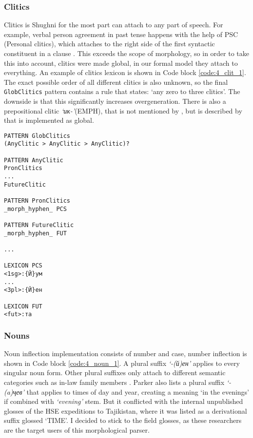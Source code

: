 \subsubsection*{Clitics}
Clitics is Shughni for the most part can attach to any part of speech. For example, verbal person agreement in past tense happens with the help of PSC (Personal clitics), which attaches to the right side of the first syntactic constituent in a clause \parencite[262]{parker_shughni_2023}. This exceeds the scope of morphology, so in order to take this into account, clitics were made global, in our formal model they attach to everything. An example of clitics lexicon is shown in Code block \ref{code:4_clit_1}. The exact possible order of all different clitics is also unknown, so the final \texttt{GlobClitics} pattern contains a rule that states: `any zero to three clitics'. The downside is that this significantly increases overgeneration. There is also a prepositional clitic \textit{`ик-'}(EMPH), that is not mentioned by \textcite{parker_shughni_2023}, but is described by \textcite{karamshoev_dict_1988} that is implemented as global.

\begin{code_frame}[float,floatplacement=!h]
    \begin{footnotesize}\codespacing
    \begin{verbatim}
PATTERN GlobClitics
(AnyClitic > AnyClitic > AnyClitic)?

PATTERN AnyClitic
PronClitics
...
FutureClitic

PATTERN PronClitics
_morph_hyphen_ PCS

PATTERN FutureClitic
_morph_hyphen_ FUT

...

LEXICON PCS
<1sg>:{Й}ум
...
<3pl>:{Й}ен

LEXICON FUT
<fut>:та
    \end{verbatim}
    \end{footnotesize}
    \tcblower
    \label{code:4_clit_1}
\end{code_frame}

\subsubsection*{Nouns}
Noun inflection implementation consists of number and case, number inflection is shown in Code block \ref{code:4_noun_1}. A plural suffix \textit{`-(й)ен'} applies to every singular noun form. Other plural suffixes only attach to different semantic categories such as in-law family members \parencite[148]{parker_shughni_2023}. Parker also lists a plural suffix \textit{`-(a)ҷев'} that applies to times of day and year, creating a meaning `in the evenings' if combined with \textit{`evening'} stem. But it conflicted with the internal unpublished glosses of the HSE expeditions to Tajikistan, where it was listed as a derivational suffix glossed `TIME'. I decided to stick to the field glosses, as these researchers are the target users of this morphological parser. 

